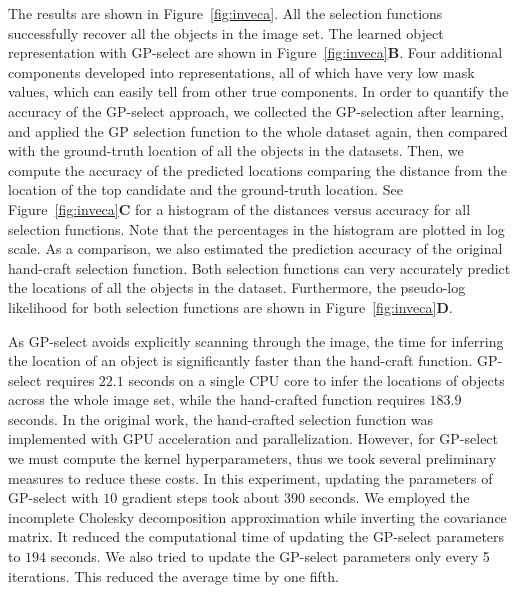 The results are shown in Figure~\ref{fig:inveca}. All the selection functions successfully recover all the objects in the image set. The learned object representation with GP-select are shown in Figure~\ref{fig:inveca}\textbf{B}.
Four additional components developed into representations, all of which have very low mask values,  which can easily tell from other true components.
In order to quantify the accuracy of the GP-select approach, we collected the GP-selection after learning, and applied the GP selection function to the whole dataset again, then compared with the ground-truth location of all the objects in the datasets.
%
Then, we compute the accuracy of the predicted locations comparing the distance from the location of the top candidate and the ground-truth location. See Figure~\ref{fig:inveca}\textbf{C} for a histogram of the distances versus accuracy for all selection functions. Note that the percentages in the histogram are plotted in log scale.
As a comparison, we also estimated the prediction accuracy of the original hand-craft selection function. Both selection functions can very accurately predict the locations of all the objects in the dataset.
Furthermore, the pseudo-log likelihood \cite{DaiEtAl2013} for both selection functions are shown in Figure~\ref{fig:inveca}\textbf{D}.

As GP-select avoids explicitly scanning through the image, the time for inferring the location of an object is significantly faster than the hand-craft function. GP-select requires $22.1$ seconds on a single CPU core to infer the locations of objects across the whole image set, while the hand-crafted function requires $183.9$ seconds. In the original work, the hand-crafted selection function was implemented with GPU acceleration and parallelization. 
However, for GP-select we must compute the kernel hyperparameters, thus we took several preliminary measures to reduce these costs. In this experiment, updating the parameters of GP-select with $10$ gradient steps took about $390$ seconds. We employed the incomplete Cholesky decomposition approximation while inverting the covariance matrix. It reduced the computational time of updating the GP-select parameters to $194$ seconds. We also tried to update the GP-select parameters only every 5 iterations. This reduced the average time by one fifth.



